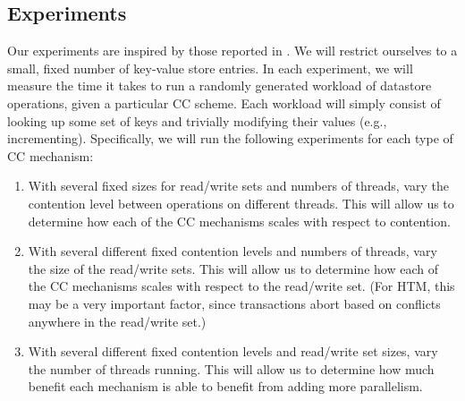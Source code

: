 \subsection{Experiments}
Our experiments are inspired by those reported in \citep{tm-eval-paper}. We will restrict ourselves to a small, fixed number of key-value store entries. In each experiment, we will measure the time it takes to run a randomly generated workload of datastore operations, given a particular CC scheme. Each workload will simply consist of looking up some set of keys and trivially modifying their values (e.g., incrementing). Specifically, we will run the following experiments for each type of CC mechanism:
\begin{enumerate}
\item With several fixed sizes for read/write sets and numbers of threads, vary the contention level between operations on different threads. This will allow us to determine how each of the CC mechanisms scales with respect to contention.
\item With several different fixed contention levels and numbers of threads, vary the size of the read/write sets. This will allow us to determine how each of the CC mechanisms scales with respect to the read/write set. (For HTM, this may be a very important factor, since transactions abort based on conflicts anywhere in the read/write set.)
\item With several different fixed contention levels and read/write set sizes, vary the number of threads running. This will allow us to determine how much benefit each mechanism is able to benefit from adding more parallelism.
\end{enumerate}

